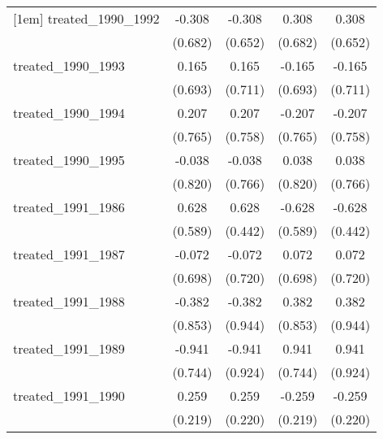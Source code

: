 {\begin{tabular}{l*{4}{c}}
[1em]
treated\_1990\_1992&      -0.308         &      -0.308         &       0.308         &       0.308         \\
            &     (0.682)         &     (0.652)         &     (0.682)         &     (0.652)         \\
[1em]
treated\_1990\_1993&       0.165         &       0.165         &      -0.165         &      -0.165         \\
            &     (0.693)         &     (0.711)         &     (0.693)         &     (0.711)         \\
[1em]
treated\_1990\_1994&       0.207         &       0.207         &      -0.207         &      -0.207         \\
            &     (0.765)         &     (0.758)         &     (0.765)         &     (0.758)         \\
[1em]
treated\_1990\_1995&      -0.038         &      -0.038         &       0.038         &       0.038         \\
            &     (0.820)         &     (0.766)         &     (0.820)         &     (0.766)         \\
[1em]
treated\_1991\_1986&       0.628         &       0.628         &      -0.628         &      -0.628         \\
            &     (0.589)         &     (0.442)         &     (0.589)         &     (0.442)         \\
[1em]
treated\_1991\_1987&      -0.072         &      -0.072         &       0.072         &       0.072         \\
            &     (0.698)         &     (0.720)         &     (0.698)         &     (0.720)         \\
[1em]
treated\_1991\_1988&      -0.382         &      -0.382         &       0.382         &       0.382         \\
            &     (0.853)         &     (0.944)         &     (0.853)         &     (0.944)         \\
[1em]
treated\_1991\_1989&      -0.941         &      -0.941         &       0.941         &       0.941         \\
            &     (0.744)         &     (0.924)         &     (0.744)         &     (0.924)         \\
[1em]
treated\_1991\_1990&       0.259         &       0.259         &      -0.259         &      -0.259         \\
            &     (0.219)         &     (0.220)         &     (0.219)         &     (0.220)         \\

\end{tabular}}
